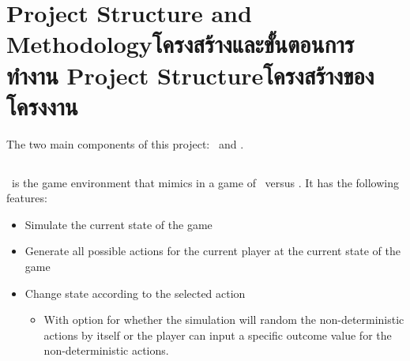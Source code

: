 \chapter{\ifproject%
\ifenglish Project Structure and Methodology\else โครงสร้างและขั้นตอนการทำงาน\fi
\else%
\ifenglish Project Structure\else โครงสร้างของโครงงาน\fi
\fi
}

The two main components of this project: \RootOurs \ and \RootAI.


\makeatletter


\makeatother

\section{\RootOurs}
\RootOurs \ is the game environment that mimics \RootV in a game of \Marquise \ versus \Eyrie. It has the following features:
\begin{itemize}
  \item Simulate the current state of the game
  \item Generate all possible actions for the current player at the current state of the game
  \item Change state according to the selected action 
  \begin{itemize}
    \item With option for whether the simulation will random the non-deterministic actions by itself or the player can input a specific outcome value for the non-deterministic actions.
  \end{itemize}
\end{itemize}


